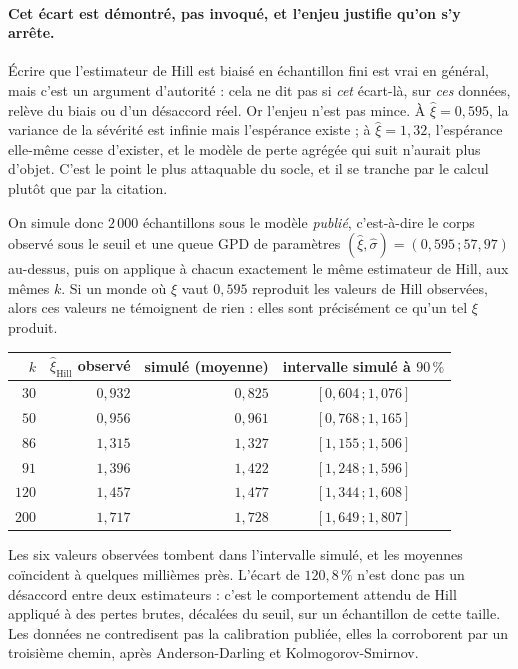 \paragraph{Cet écart est démontré, pas invoqué, et l'enjeu justifie qu'on s'y arrête.}
Écrire que l'estimateur de Hill est biaisé en échantillon fini est vrai en général, mais c'est
un argument d'autorité : cela ne dit pas si \emph{cet} écart-là, sur \emph{ces} données, relève
du biais ou d'un désaccord réel. Or l'enjeu n'est pas mince. À $\hat\xi = 0{,}595$, la variance
de la sévérité est infinie mais l'espérance existe ; à $\hat\xi = 1{,}32$, l'espérance elle-même
cesse d'exister, et le modèle de perte agrégée qui suit n'aurait plus d'objet. C'est le point le
plus attaquable du socle, et il se tranche par le calcul plutôt que par la citation.

On simule donc $2\,000$ échantillons sous le modèle \emph{publié}, c'est-à-dire le corps observé
sous le seuil et une queue GPD de paramètres $(\hat\xi,\hat\sigma) = (0{,}595\,;57{,}97)$
au-dessus, puis on applique à chacun exactement le même estimateur de Hill, aux mêmes $k$. Si un
monde où $\xi$ vaut $0{,}595$ reproduit les valeurs de Hill observées, alors ces valeurs ne
témoignent de rien : elles sont précisément ce qu'un tel $\xi$ produit.

\begin{center}\footnotesize
\renewcommand{\arraystretch}{1.25}
\begin{tabular}{@{}r r r c@{}}
\toprule
$k$ & $\hat\xi_{\text{Hill}}$ observé & simulé (moyenne) & intervalle simulé à $90\,\%$ \\
\midrule
$30$  & $0{,}932$ & $0{,}825$ & $[0{,}604\,;1{,}076]$ \\
$50$  & $0{,}956$ & $0{,}961$ & $[0{,}768\,;1{,}165]$ \\
$86$  & $1{,}315$ & $1{,}327$ & $[1{,}155\,;1{,}506]$ \\
$91$  & $1{,}396$ & $1{,}422$ & $[1{,}248\,;1{,}596]$ \\
$120$ & $1{,}457$ & $1{,}477$ & $[1{,}344\,;1{,}608]$ \\
$200$ & $1{,}717$ & $1{,}728$ & $[1{,}649\,;1{,}807]$ \\
\bottomrule
\end{tabular}
\end{center}

\vspace{4pt}
\noindent Les six valeurs observées tombent dans l'intervalle simulé, et les moyennes coïncident
à quelques millièmes près. L'écart de $120{,}8\,\%$ n'est donc pas un désaccord entre deux
estimateurs : c'est le comportement attendu de Hill appliqué à des pertes brutes, décalées du
seuil, sur un échantillon de cette taille. Les données ne contredisent pas la calibration
publiée, elles la corroborent par un troisième chemin, après Anderson-Darling et
Kolmogorov-Smirnov.

